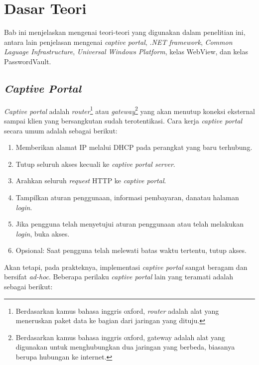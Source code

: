 \chapter{Dasar Teori}
\label{chap:dasar_teori}

Bab ini menjelaskan mengenai teori-teori yang digunakan dalam penelitian ini, antara lain penjelasan mengenai \textit{captive portal}, \textit{.NET framework}, \textit{Common Laguage Infrastructure}, \textit{Universal Windows Platform}, kelas WebView, dan kelas PasswordVault.



\section{\textit{Captive Portal}}
\label{sec:captive_portal}

\textit{Captive portal} adalah \textit{router}\footnote{Berdasarkan kamus bahasa inggris oxford, \textit{router} adalah alat yang meneruskan paket data ke bagian dari jaringan yang dituju.} atau \textit{gateway}\footnote{Berdasarkan kamus bahasa inggris oxford, gateway adalah alat yang digunakan untuk menghubungkan dua jaringan yang berbeda, biasanya berupa hubungan ke internet.} yang akan menutup koneksi eksternal sampai klien yang bersangkutan sudah terotentikasi\cite{Potter:2002}. Cara kerja \textit{captive portal} secara umum adalah sebagai berikut:

\begin{enumerate}
    \item{Memberikan alamat IP melalui DHCP pada perangkat yang baru terhubung.}
    \item{Tutup seluruh akses kecuali ke \textit{captive portal server}.}
    \item{Arahkan seluruh \textit{request} HTTP ke \textit{captive portal}.}
    \item{Tampilkan aturan penggunaan, informasi pembayaran, dan\/atau halaman \textit{login}.}
    \item{Jika pengguna telah menyetujui aturan penggunaan atau telah melakukan \textit{login}, buka akses.}
    \item{Opsional: Saat pengguna telah melewati batas waktu tertentu, tutup akses.}
\end{enumerate}

Akan tetapi, pada prakteknya, implementasi \textit{captive portal} sangat beragam dan bersifat \textit{ad-hoc}\cite{HTTPWG_CP:2016}. Beberapa perilaku \textit{captive portal} lain yang teramati adalah sebagai berikut:

